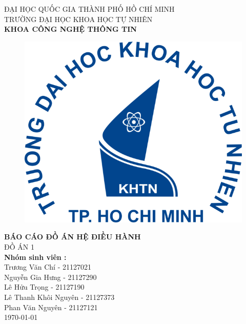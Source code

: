 \begin{titlepage}
\usetikzlibrary{calc}

\begin{center}
    \large \vspace {2cm} ĐẠI HỌC QUỐC GIA THÀNH PHỐ HỒ CHÍ MINH\\
    TRƯỜNG ĐẠI HỌC KHOA HỌC TỰ NHIÊN\\
    \textbf{KHOA CÔNG NGHỆ THÔNG TIN}\\[2cm]
    \begin{figure}[htp]
    \centering
    \includegraphics[scale=.17]{logo.png}
    \label{fig:my_label}
\end{figure}
    { \huge  \bfseries BÁO CÁO ĐỒ ÁN HỆ ĐIỀU HÀNH \\[1cm] } 
    \huge ĐỒ ÁN 1\\[1.5cm]
    \large
    \textbf{Nhóm sinh viên :}\\
    Trương Văn Chí - 21127021\\
    Nguyễn Gia Hưng - 21127290 \\
    Lê Hửu Trọng - 21127190\\
    Lê Thanh Khôi Nguyên - 21127373\\
    Phan Văn Nguyên - 21127121\\[5cm]
    
   
    \today
{}
\end{center}
\end{titlepage}